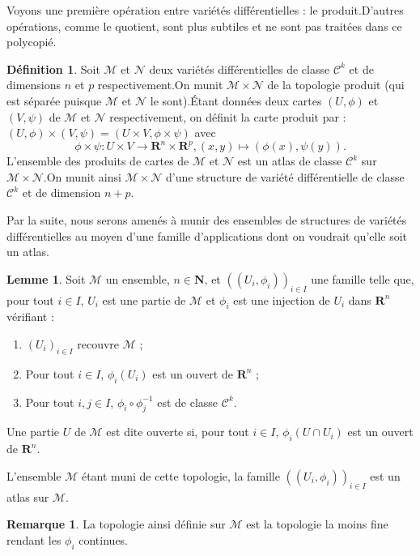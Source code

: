 \documentclass[12pt,a4paper]{article}
\theoremstyle{definition}
\newtheorem{defn}[thm]{Définition}
\newtheorem{rqe}[thm]{Remarque}
\newtheorem{lem}[thm]{Lemme}
\begin{document}
Voyons une première opération entre variétés différentielles : le produit.\newline D'autres opérations, comme le quotient, sont plus subtiles et ne sont pas traitées dans ce polycopié.
\begin{defn}
Soit $\mathcal{M}$ et $\mathcal{N}$ deux variétés différentielles de classe $\mathcal{C}^k$ et de dimensions $n$ et $p$ respectivement.\newline On munit $\mathcal{M}\times\mathcal{N}$ de la topologie produit (qui est séparée puisque $\mathcal{M}$ et $\mathcal{N}$ le sont).\newline Étant données deux cartes $(U,\phi)$ et $(V,\psi)$ de $\mathcal{M}$ et $\mathcal{N}$ respectivement, on définit la carte produit par : $(U,\phi)\times (V,\psi)=(U\times V,\phi\times\psi)$ avec
$$\phi\times\psi:U\times V\to\mathbf{R}^n\times\mathbf{R}^p,(x,y)\mapsto (\phi(x),\psi(y)).$$
L'ensemble des produits de cartes de $\mathcal{M}$ et $\mathcal{N}$ est un atlas de classe $\mathcal{C}^k$ sur $\mathcal{M}\times\mathcal{N}$.\newline On munit ainsi $\mathcal{M}\times\mathcal{N}$ d'une structure de variété différentielle de classe $\mathcal{C}^k$ et de dimension $n+p$.
\end{defn}
Par la suite, nous serons amenés à munir des ensembles de structures de variétés différentielles au moyen d'une famille d'applications dont on voudrait qu'elle soit un atlas.
\begin{lem}
Soit $\mathcal{M}$ un ensemble, $n\in\mathbf{N}$, et $((U_i,\phi_i))_{i\in I}$ une famille telle que, pour tout $i\in I$, $U_i$ est une partie de $\mathcal{M}$ et $\phi_i$ est une injection de $U_i$ dans $\mathbf{R}^n$ vérifiant :
\begin{enumerate}[label=\roman*)]
\item $(U_i)_{i\in I}$ recouvre $\mathcal{M}$ ;
\item Pour tout $i\in I$, $\phi_i(U_i)$ est un ouvert de $\mathbf{R}^n$ ;
\item Pour tout $i,j\in I$, $\phi_i\circ\phi_j^{-1}$ est de classe $\mathcal{C}^k$.
\end{enumerate}
Une partie $U$ de $\mathcal{M}$ est dite ouverte si, pour tout $i\in I$, $\phi_i(U\cap U_i)$ est un ouvert de $\mathbf{R}^n$.\newline

L'ensemble $\mathcal{M}$ étant muni de cette topologie, la famille $((U_i,\phi_i))_{i\in I}$ est un atlas sur $\mathcal{M}$.
\end{lem}
\begin{rqe}
La topologie ainsi définie sur $\mathcal{M}$ est la topologie la moins fine rendant les $\phi_i$ continues.
\end{rqe}
\newpage
\end{document}
